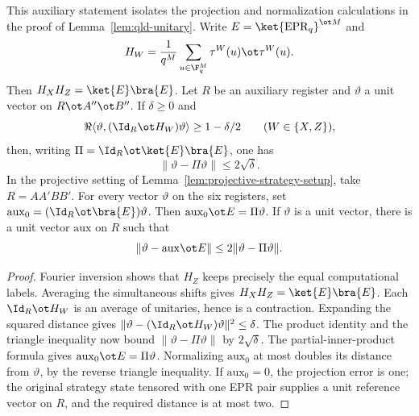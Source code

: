 \begin{theorem}\label{thm:qld-epr-projection-estimates}
	\leanok
	This auxiliary statement isolates the projection and normalization
	calculations in the proof of Lemma~\ref{lem:qld-unitary}.
	Write $E=\ket{\mathrm{EPR}_q}^{\ot M}$ and
	\[
		H_W=\frac{1}{q^M}\sum_{u\in\F_q^M}\tau^W(u)\ot\tau^W(u).
	\]
	Then $H_XH_Z=\ket{E}\bra{E}$. Let $R$ be an auxiliary register and
	$\vartheta$ a unit vector on $R\ot A''\ot B''$. If $\delta\geq0$ and
	\[
		\Re\langle\vartheta,(\Id_R\ot H_W)\vartheta\rangle
		\geq1-\delta/2\qquad(W\in\{X,Z\}),
	\]
	then, writing $\Pi=\Id_R\ot\ket{E}\bra{E}$, one has
	\[
		\|\vartheta-\Pi\vartheta\|\leq2\sqrt\delta.
	\]
	In the projective setting of Lemma~\ref{lem:projective-strategy-setup},
	take $R=AA'BB'$. For every vector $\vartheta$ on the six registers, set
	$\mathrm{aux}_0=(\Id_R\ot\bra{E})\vartheta$. Then
	$\mathrm{aux}_0\ot E=\Pi\vartheta$. If $\vartheta$ is a unit vector, there is
	a unit vector $\mathrm{aux}$ on $R$ such that
	\[
		\|\vartheta-\mathrm{aux}\ot E\|
		\leq2\|\vartheta-\Pi\vartheta\|.
	\]
\end{theorem}
\begin{proof}
	\leanok
	Fourier inversion shows that $H_Z$ keeps precisely the equal computational
	labels. Averaging the simultaneous shifts gives $H_XH_Z=\ket{E}\bra{E}$.
	Each $\Id_R\ot H_W$ is an average of unitaries, hence is a contraction.
	Expanding the squared distance gives
	$\|\vartheta-(\Id_R\ot H_W)\vartheta\|^2\leq\delta$.
	The product identity and the triangle inequality now bound
	$\|\vartheta-\Pi\vartheta\|$ by $2\sqrt\delta$.
	The partial-inner-product formula gives
	$\mathrm{aux}_0\ot E=\Pi\vartheta$. Normalizing $\mathrm{aux}_0$
	at most doubles its distance from $\vartheta$, by the reverse triangle
	inequality. If $\mathrm{aux}_0=0$, the projection error is one; the
	original strategy state tensored with one EPR pair supplies a unit
	reference vector on $R$, and the required distance is at most two.
\end{proof}

